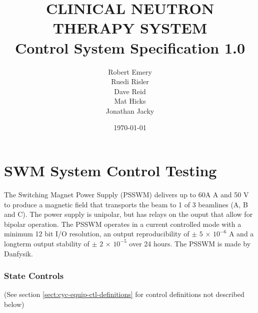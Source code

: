 \documentclass[11pt]{book}		%
\title{CLINICAL NEUTRON THERAPY SYSTEM\\
	Control System Specification 1.0\\[1.0cm]}
\author{Robert Emery\\
	Ruedi Risler\\
	Dave Reid \\
	Mat Hicks \\
        Jonathan Jacky}
\date{\today}
\begin{document}
\chapter{SWM System Control Testing}

The Switching Magnet Power Supply (PSSWM) delivers up to 60A A and 50 V to produce a magnetic field that transports the beam to 1 of 3 beamlines (A, B and C). The power supply is unipolar, but has relays on the ouput that allow for bipolar operation. The PSSWM operates in a current controlled mode with a minimum 12 bit I/O resolution, an output reproducibility of $\pm$ $5$ $\times$ $10^{-6}$ A and a longterm output stability of $\pm$ $2$ $\times$ $10^{-5}$ over 24 hours. The PSSWM is made by Danfysik. 

\subsection{State Controls} \label{sect:cyc-equip-ctl-beamline-swm-state-controls}
(See section \ref{sect:cyc-equip-ctl-definitions} for control definitions not described below)
\end{document}
